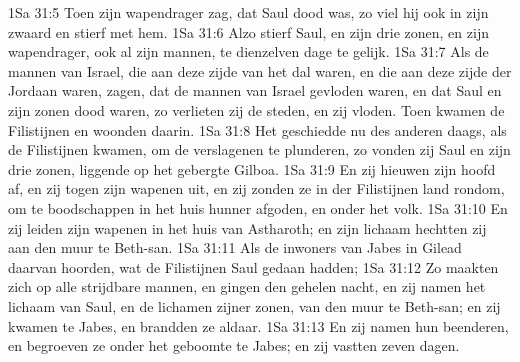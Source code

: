 1Sa 31:5  Toen zijn wapendrager zag, dat Saul dood was, zo viel hij ook in zijn zwaard en stierf met hem.
1Sa 31:6  Alzo stierf Saul, en zijn drie zonen, en zijn wapendrager, ook al zijn mannen, te dienzelven dage te gelijk.
1Sa 31:7  Als de mannen van Israel, die aan deze zijde van het dal waren, en die aan deze zijde der Jordaan waren, zagen, dat de mannen van Israel gevloden waren, en dat Saul en zijn zonen dood waren, zo verlieten zij de steden, en zij vloden. Toen kwamen de Filistijnen en woonden daarin.
1Sa 31:8  Het geschiedde nu des anderen daags, als de Filistijnen kwamen, om de verslagenen te plunderen, zo vonden zij Saul en zijn drie zonen, liggende op het gebergte Gilboa.
1Sa 31:9  En zij hieuwen zijn hoofd af, en zij togen zijn wapenen uit, en zij zonden ze in der Filistijnen land rondom, om te boodschappen in het huis hunner afgoden, en onder het volk.
1Sa 31:10  En zij leiden zijn wapenen in het huis van Astharoth; en zijn lichaam hechtten zij aan den muur te Beth-san.
1Sa 31:11  Als de inwoners van Jabes in Gilead daarvan hoorden, wat de Filistijnen Saul gedaan hadden;
1Sa 31:12  Zo maakten zich op alle strijdbare mannen, en gingen den gehelen nacht, en zij namen het lichaam van Saul, en de lichamen zijner zonen, van den muur te Beth-san; en zij kwamen te Jabes, en brandden ze aldaar.
1Sa 31:13  En zij namen hun beenderen, en begroeven ze onder het geboomte te Jabes; en zij vastten zeven dagen.



